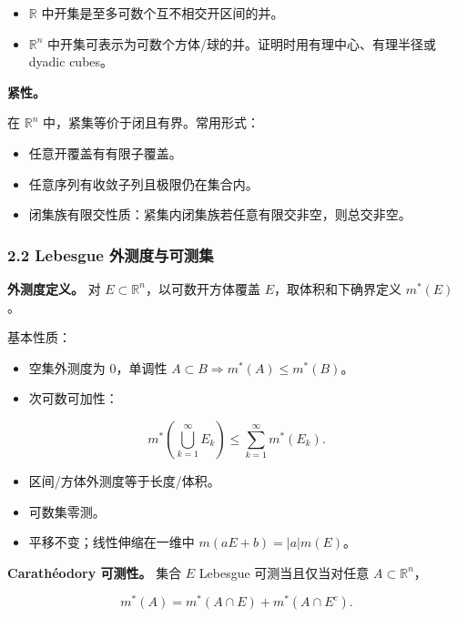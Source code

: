 \documentclass[
UTF8]{ctexart}
\providecommand{\tightlist}{%
\setlength{\itemsep}{0pt}\setlength{\parskip}{0pt}}
\begin{document}
\begin{itemize}
    \tightlist
  \item
    \(\mathbb R\) 中开集是至多可数个互不相交开区间的并。
  \item
    \(\mathbb R^n\)
    中开集可表示为可数个方体/球的并。证明时用有理中心、有理半径或 dyadic
    cubes。
\end{itemize}

\textbf{紧性。}

在 \(\mathbb R^n\) 中，紧集等价于闭且有界。常用形式：

\begin{itemize}
    \tightlist
  \item
    任意开覆盖有有限子覆盖。
  \item
    任意序列有收敛子列且极限仍在集合内。
  \item
    闭集族有限交性质：紧集内闭集族若任意有限交非空，则总交非空。
\end{itemize}

\subsubsection{2.2 Lebesgue
外测度与可测集}\label{lebesgue-ux5916ux6d4bux5ea6ux4e0eux53efux6d4bux96c6}

\textbf{外测度定义。} 对 \(E\subset\mathbb R^n\)，以可数开方体覆盖
\(E\)，取体积和下确界定义 \(m^*(E)\)。

基本性质：

\begin{itemize}
    \tightlist
  \item
    空集外测度为 \(0\)，单调性
    \(A\subset B\Rightarrow m^*(A)\le m^*(B)\)。
  \item
    次可数可加性：
\end{itemize}

\[
  m^*(\bigcup_{k=1}^{\infty}E_k)\le \sum_{k=1}^{\infty}m^*(E_k).
\]

\begin{itemize}
    \tightlist
  \item
    区间/方体外测度等于长度/体积。
  \item
    可数集零测。
  \item
    平移不变；线性伸缩在一维中 \(m(aE+b)=|a|m(E)\)。
\end{itemize}

\textbf{Carathéodory 可测性。} 集合 \(E\) Lebesgue 可测当且仅当对任意
\(A\subset\mathbb R^n\)，

\[
  m^*(A)=m^*(A\cap E)+m^*(A\cap E^c).
\]
\end{document}

